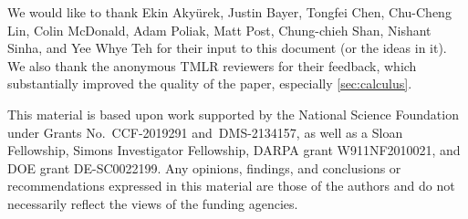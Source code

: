 We would like to thank Ekin Aky\"{u}rek, Justin Bayer, Tongfei Chen, Chu-Cheng Lin, Colin McDonald, Adam Poliak, Matt Post, Chung-chieh Shan, Nishant Sinha, and Yee Whye Teh for their input to this document (or the ideas in it). We also thank the anonymous TMLR reviewers for their feedback, which substantially improved the quality of the paper, especially \cref{sec:calculus}.

This material is based upon work supported by the National Science Foundation under Grants No.~CCF-2019291 and~DMS-2134157, as well as a Sloan Fellowship, Simons Investigator Fellowship, DARPA grant W911NF2010021, and DOE grant DE-SC0022199. 
Any opinions, findings, and conclusions or recommendations expressed in this material are those of the authors and do not necessarily reflect the views of the funding agencies.
